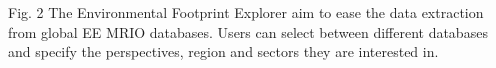 Fig. 2 The Environmental Footprint Explorer aim to ease the data extraction from global EE MRIO databases. Users can select between different databases and specify the perspectives, region and sectors they are interested in.